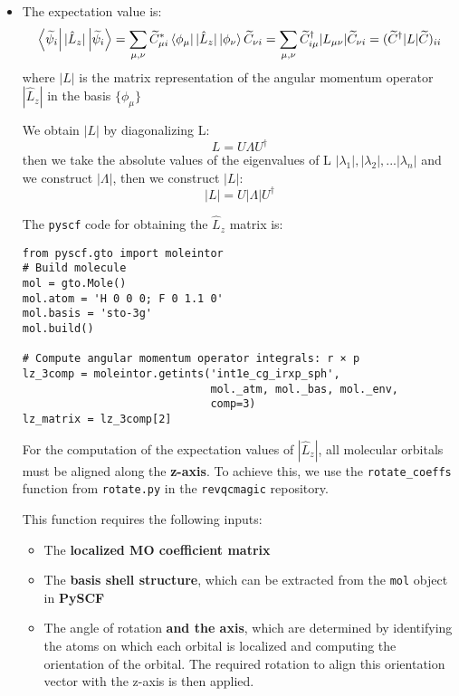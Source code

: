\documentclass{article}
\begin{document}
\begin{itemize}
    \item The expectation value is:
    \[
    \bra{\widetilde{\psi}_i} {|\hat{L}_z|}\ket{\widetilde{\psi}_i} = \sum_{\mu,\nu} \widetilde{C}_{\mu i}^{*} \bra{\phi_\mu} |\hat{L}_z| \ket{\phi_\nu} \widetilde{C}_{\nu i} = \sum_{\mu,\nu} \widetilde{C}_{i \mu}^{\dagger} |L_{\mu \nu}| \widetilde{C}_{\nu i} = (\widetilde{C}^{\dagger} |L \rvert \widetilde{C})_{ii}
    \]
    where \( |L| \) is the matrix representation of the angular momentum operator \(|\hat{L}_z|\) in the basis \( \{ \phi_\mu \} \) 

    We obtain \( |L| \) by diagonalizing L:
    \[
    L = U\Lambda U^{\dagger}
    \] 
    then we take the absolute values of the eigenvalues of L $|\lambda_1|, |\lambda_2|, ... |\lambda_n|$ and we construct $|\Lambda|$, then we construct $|L|$:
    \[
    |L| = U \lvert \Lambda \rvert U^{\dagger}
    \] 

    The \verb|pyscf| code for obtaining the $\hat{L}_z$ matrix is:

\begin{verbatim}
from pyscf.gto import moleintor
# Build molecule
mol = gto.Mole()
mol.atom = 'H 0 0 0; F 0 1.1 0'  
mol.basis = 'sto-3g'            
mol.build()

# Compute angular momentum operator integrals: r × p
lz_3comp = moleintor.getints('int1e_cg_irxp_sph',
                             mol._atm, mol._bas, mol._env,
                             comp=3)
lz_matrix = lz_3comp[2]

\end{verbatim}

For the computation of the expectation values of $|\hat{L}_z|$, all molecular orbitals must be aligned along the \textbf{z-axis}. To achieve this, we use the \verb|rotate_coeffs| function from \verb|rotate.py| in the \verb|revqcmagic| repository.

This function requires the following inputs:
\begin{itemize}
    \item The \textbf{localized MO coefficient matrix}
    \item The \textbf{basis shell structure}, which can be extracted from the \verb|mol| object in \textbf{PySCF}
    \item The angle of rotation \textbf{ and the axis}, which are determined by identifying the atoms on which each orbital is localized and computing the orientation of the orbital. The required rotation to align this orientation vector with the z-axis is then applied.
\end{itemize}


\end{itemize}
\end{document}
